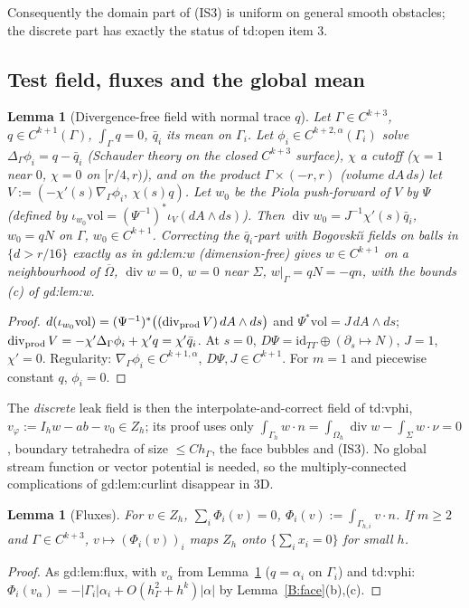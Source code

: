 \documentclass[11pt]{article}
\newtheorem{lemma}[theorem]{Lemma}
\theoremstyle{definition}
\newcommand{\hG}{h_\Gamma}
\newcommand{\Gh}{\Gamma_h}
\newcommand{\Oh}{\Omega_h}
\newcommand{\Zh}{Z_h}
\renewcommand{\div}{\operatorname{div}}
\begin{document}
Consequently the domain part of (IS3) is uniform on general smooth obstacles; the discrete part has exactly the status of td:open item 3.

\subsection{Test field, fluxes and the global mean}
\begin{lemma}[Divergence-free field with normal trace $q$]\label{B:w}
Let $\Gamma\in C^{k+3}$, $q\in C^{k+1}(\Gamma)$, $\int_\Gamma q=0$, $\bar q_i$ its mean on $\Gamma_i$. Let $\phi_i\in C^{k+2,\alpha}(\Gamma_i)$ solve $\Delta_\Gamma\phi_i=q-\bar q_i$ (Schauder theory on the closed $C^{k+3}$ surface), $\chi$ a cutoff ($\chi=1$ near $0$, $\chi=0$ on $[r/4,r)$), and on the product $\Gamma\times(-r,r)$ (volume $dA\,ds$) let $V:=(-\chi'(s)\nabla_\Gamma\phi_i,\ \chi(s)q)$. Let $w_0$ be the Piola push-forward of $V$ by $\Psi$ (defined by $\iota_{w_0}\mathrm{vol}=(\Psi^{-1})^\ast\iota_V(dA\wedge ds)$). Then $\div w_0=J^{-1}\chi'(s)\bar q_i$, $w_0=qN$ on $\Gamma$, $w_0\in C^{k+1}$. Correcting the $\bar q_i$-part with Bogovski\u{\i} fields on balls in $\{d>r/16\}$ exactly as in gd:lem:w (dimension-free) gives $w\in C^{k+1}$ on a neighbourhood of $\overline\Omega$, $\div w=0$, $w=0$ near $\Sigma$, $w|_\Gamma=qN=-qn$, with the bounds (c) of gd:lem:w.
\end{lemma}
\begin{proof}
$d(\iota_{w_0}\mathrm{vol})=(\Psi^{-1})^\ast\bigl((\operatorname{div}_{\rm prod}V)\,dA\wedge ds\bigr)$ and $\Psi^\ast\mathrm{vol}=J\,dA\wedge ds$; $\operatorname{div}_{\rm prod}V=-\chi'\Delta_\Gamma\phi_i+\chi'q=\chi'\bar q_i$. At $s=0$, $D\Psi=\mathrm{id}_{T\Gamma}\oplus(\partial_s\mapsto N)$, $J=1$, $\chi'=0$. Regularity: $\nabla_\Gamma\phi_i\in C^{k+1,\alpha}$, $D\Psi,J\in C^{k+1}$. For $m=1$ and piecewise constant $q$, $\phi_i=0$.
\end{proof}
The \emph{discrete} leak field is then the interpolate-and-correct field of td:vphi, $v_\varphi:=I_hw-ab-v_0\in\Zh$; its proof uses only $\int_{\Gh}w\cdot n=\int_{\Oh}\div w-\int_\Sigma w\cdot\nu=0$, boundary tetrahedra of size $\le C\hG$, the face bubbles and (IS3). No global stream function or vector potential is needed, so the multiply-connected complications of gd:lem:curlint disappear in 3D.

\begin{lemma}[Fluxes]\label{B:flux}
For $v\in\Zh$, $\sum_i\Phi_i(v)=0$, $\Phi_i(v):=\int_{\Gamma_{h,i}}v\cdot n$. If $m\ge2$ and $\Gamma\in C^{k+3}$, $v\mapsto(\Phi_i(v))_i$ maps $\Zh$ onto $\{\sum_ix_i=0\}$ for small $h$.
\end{lemma}
\begin{proof}
As gd:lem:flux, with $v_\alpha$ from Lemma~\ref{B:w} ($q=\alpha_i$ on $\Gamma_i$) and td:vphi: $\Phi_i(v_\alpha)=-|\Gamma_i|\alpha_i+O(\hG^2+h^k)|\alpha|$ by Lemma~\ref{B:face}(b),(c).
\end{proof}
\end{document}
